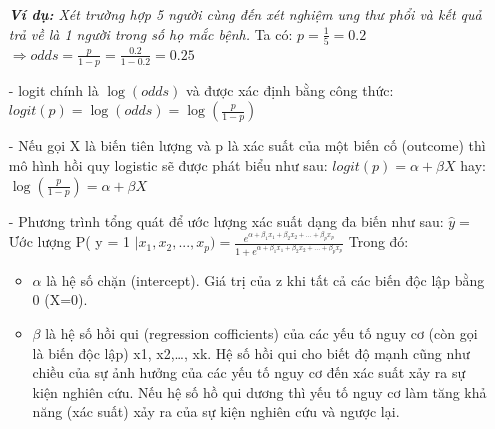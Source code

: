 \documentclass{report}
\newcommand\tab[1][1.25cm]{\hspace*{#1}}
\begin{document}
\begin{enumerate}
        \vspace{0.2cm}\tab\textit{\textbf{Ví dụ:} Xét trường hợp 5 người cùng đến xét nghiệm ung thư phổi và kết quả trả về là 1 người trong số họ mắc bệnh.}\vspace{0.2cm}
        \newline\tab\quad Ta có: $p = \frac{1}{5} = 0.2$\\
        \vspace{0.2cm}\newline\tab\quad$\Rightarrow odds = \frac{p}{1 - p} = \frac{0.2}{1-0.2} = 0.25$
        \item [- ] logit chính là $\log(odds)$ và được xác định bằng công thức: \\\tab\textbf{$logit(p) = \log(odds) = \log(\frac{p}{1 - p})$}
        \item [- ] Nếu gọi X là biến tiên lượng và p là xác suất của một biến cố (outcome) thì mô hình hồi quy logistic sẽ được phát biểu như sau:
        \vspace{0.2cm}\newline\tab[6cm] $logit(p) = \alpha + \beta X$ \newline\tab[5cm] hay: \vspace{0.2cm}\newline\tab[6cm] $\log(\frac{p}{1 - p}) = \alpha + \beta X$
        \item [- ] Phương trình tổng quát để ước lượng xác suất dạng đa biến như sau:
        \vspace{0.2cm}\newline\tab[2cm] $\hat{y} = $ Ước lượng P( y = 1 $\mid x_1, x_2,...,x_p) = \frac{e^{\alpha + \beta_1x_1 + \beta_2x_2 + ... + \beta_px_p}}{1 + e^{\alpha + \beta_1x_1 + \beta_2x_2 + ... + \beta_px_p}}$
        Trong đó:
        \begin{itemize}
            \item $\alpha$ là hệ số chặn (intercept). Giá trị của z khi tất cả các biến độc lập bằng 0 (X=0).
            \item $\beta$ là hệ số hồi qui (regression cofficients) của các  yếu tố nguy cơ (còn gọi là biến độc lập) x1, x2,…, xk. Hệ số hồi qui cho biết độ mạnh cũng như chiều của sự ảnh hưởng của các yếu tố nguy cơ đến xác suất xảy ra sự kiện nghiên cứu. Nếu hệ số hồ qui dương thì yếu tố nguy cơ làm tăng khả năng (xác suất) xảy ra của sự kiện nghiên cứu và ngược lại.
        \end{itemize}
        \begin{center}
            \begin{figure}[htp]

\end{figure}
\end{center}
\end{enumerate}
\end{document}
